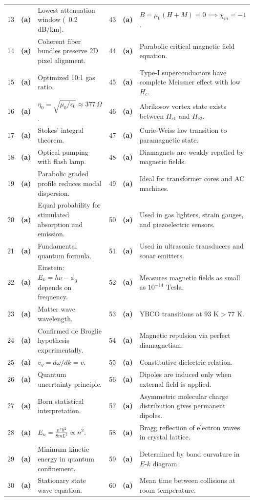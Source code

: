 \begin{center}
\begin{tabularx}{\textwidth}{l c X l c X}
13 & \textbf{(a)} & Lowest attenuation window (~0.2 dB/km). & 43 & \textbf{(a)} & $B = \mu_0(H+M) = 0 \implies \chi_m = -1$. \\
14 & \textbf{(a)} & Coherent fiber bundles preserve 2D pixel alignment. & 44 & \textbf{(a)} & Parabolic critical magnetic field equation. \\
15 & \textbf{(a)} & Optimized 10:1 gas ratio. & 45 & \textbf{(a)} & Type-I superconductors have complete Meissner effect with low $H_c$. \\
16 & \textbf{(a)} & $\eta_0 = \sqrt{\mu_0/\epsilon_0} \approx 377\,\Omega$. & 46 & \textbf{(a)} & Abrikosov vortex state exists between $H_{c1}$ and $H_{c2}$. \\
17 & \textbf{(a)} & Stokes' integral theorem. & 47 & \textbf{(a)} & Curie-Weiss law transition to paramagnetic state. \\
18 & \textbf{(a)} & Optical pumping with flash lamp. & 48 & \textbf{(a)} & Diamagnets are weakly repelled by magnetic fields. \\
19 & \textbf{(a)} & Parabolic graded profile reduces modal dispersion. & 49 & \textbf{(a)} & Ideal for transformer cores and AC machines. \\
20 & \textbf{(a)} & Equal probability for stimulated absorption and emission. & 50 & \textbf{(a)} & Used in gas lighters, strain gauges, and piezoelectric sensors. \\
21 & \textbf{(a)} & Fundamental quantum formula. & 51 & \textbf{(a)} & Used in ultrasonic transducers and sonar emitters. \\
22 & \textbf{(a)} & Einstein: $E_k = h\nu - \phi_0$ depends on frequency. & 52 & \textbf{(a)} & Measures magnetic fields as small as $10^{-14}\text{ Tesla}$. \\
23 & \textbf{(a)} & Matter wave wavelength. & 53 & \textbf{(a)} & YBCO transitions at $93\text{ K} > 77\text{ K}$. \\
24 & \textbf{(a)} & Confirmed de Broglie hypothesis experimentally. & 54 & \textbf{(a)} & Magnetic repulsion via perfect diamagnetism. \\
25 & \textbf{(a)} & $v_g = d\omega/dk = v$. & 55 & \textbf{(a)} & Constitutive dielectric relation. \\
26 & \textbf{(a)} & Quantum uncertainty principle. & 56 & \textbf{(a)} & Dipoles are induced only when external field is applied. \\
27 & \textbf{(a)} & Born statistical interpretation. & 57 & \textbf{(a)} & Asymmetric molecular charge distribution gives permanent dipoles. \\
28 & \textbf{(a)} & $E_n = \frac{n^2 h^2}{8mL^2} \propto n^2$. & 58 & \textbf{(a)} & Bragg reflection of electron waves in crystal lattice. \\
29 & \textbf{(a)} & Minimum kinetic energy in quantum confinement. & 59 & \textbf{(a)} & Determined by band curvature in $E$-$k$ diagram. \\
30 & \textbf{(a)} & Stationary state wave equation. & 60 & \textbf{(a)} & Mean time between collisions at room temperature. \\
\bottomrule
\end{tabularx}
\end{center}
\vspace{2mm}
